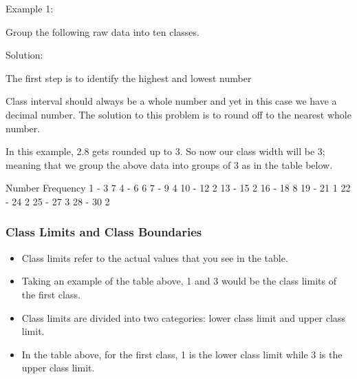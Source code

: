 \documentclass{beamer}
\begin{document}
\begin{frame}
	
	Example 1:
	
	Group the following raw data into ten classes.
	
	
	
	Solution:
	
	The first step is to identify the highest and lowest number
	
	
	
	
	
\end{frame}
\begin{frame}
	
	
	Class interval should always be a whole number and yet in this case we have a decimal number. The solution to this problem is to round off to the nearest whole number.
	
	In this example, 2.8 gets rounded up to 3. So now our class width will be 3; meaning that we group the above data into groups of 3 as in the table below.
	
	
\end{frame}
\begin{frame}
	
	Number	 Frequency
	1 - 3	 7
	4 - 6	 6
	7 - 9	 4
	10 - 12	 2
	13 - 15	 2
	16 - 18	 8
	19 - 21	 1
	22 - 24	 2
	25 - 27	 3
	28 - 30	 2
	
	
\end{frame}
\begin{frame}
	\frametitle{Class Limits and Class Boundaries}
	\Large
	\vspace{-1cm}
	\begin{itemize}
		\item 
		Class limits refer to the actual values that you see in the table. 
		\item Taking an example of the table above, 1 and 3 would be the class limits of the first class. 
		\item 
		Class limits are divided into two categories: lower class limit and upper class limit. \item In the table above, for the first class, 1 is the lower class limit while 3 is the upper class limit.
	\end{itemize}
\end{frame}
\end{document}
